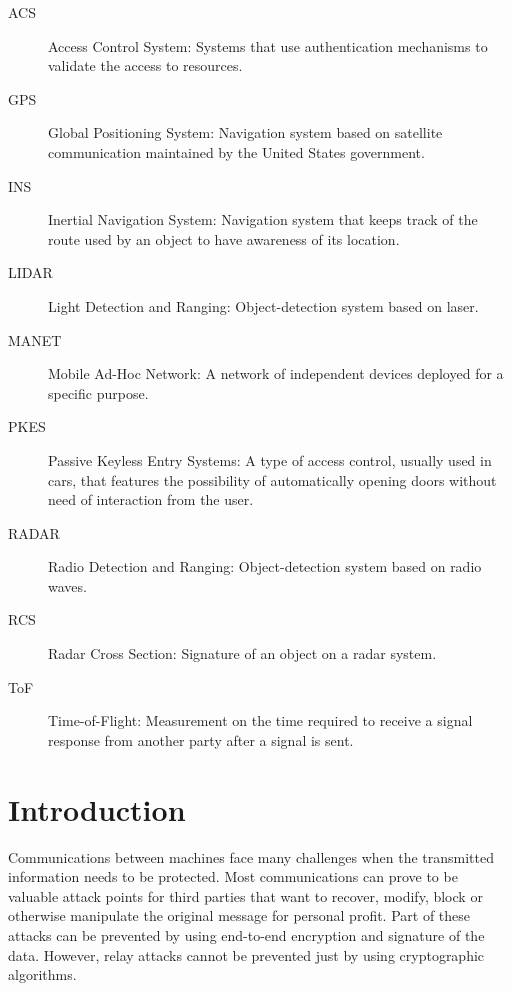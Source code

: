 \documentclass{article}
\begin{document}
\begin{description}
  \item[ACS] Access Control System: Systems that use authentication mechanisms to validate the access to resources.
  \item[GPS] Global Positioning System: Navigation system based on satellite communication maintained by the United States government.
  \item[INS] Inertial Navigation System: Navigation system that keeps track of the route used by an object to have awareness of its location.
  \item[LIDAR] Light Detection and Ranging: Object-detection system based on laser.
  \item[MANET] Mobile Ad-Hoc Network: A network of independent devices deployed for a specific purpose.
  \item[PKES] Passive Keyless Entry Systems: A type of access control, usually used in cars, that features the possibility of automatically opening doors without need of interaction from the user.
  \item[RADAR] Radio Detection and Ranging: Object-detection system based on radio waves.
  \item[RCS] Radar Cross Section: Signature of an object on a radar system.
  \item[ToF] Time-of-Flight: Measurement on the time required to receive a signal response from another party after a signal is sent.
\end{description}

\newpage



\tableofcontents





\newpage








\section{Introduction}
\label{sec:introduction}

Communications between machines face many challenges when the transmitted information needs to be protected. Most communications can prove to be valuable attack points for third parties that want to recover, modify, block or otherwise manipulate the original message for personal profit. Part of these attacks can be prevented by using end-to-end encryption and signature of the data. However, relay attacks cannot be prevented just by using cryptographic algorithms.\\
\end{document}
